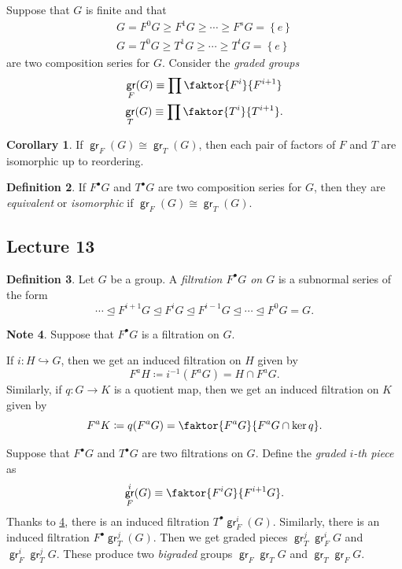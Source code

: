 \documentclass[10pt,letterpaper,cm]{nupset}
\theoremstyle{definition}
\newtheorem{definition}{Definition}[subsection]
\newtheorem{note}[definition]{Note}
\theoremstyle{theorem}
\newtheorem{corollary}[definition]{Corollary}
\theoremstyle{remark}
\newcommand{\1}{\mathbf{1}}
\newcommand{\0}{\vec 0}
\DeclareMathOperator{\gr}{\mathsf{gr}}
\begin{document}
\smallskip

Suppose that $G$ is finite and that 
\begin{gather*}
G = F^0G \geq F^1G \geq \cdots \geq F^sG = \left\{e\right\}  
\\ G = T^0G \geq T^1G \geq \cdots \geq T^tG = \left\{e\right\}
\end{gather*}
are two composition series for $G$. Consider the \textit{graded groups} 
\begin{gather*}
\gr_F(G) \equiv \prod \faktor{F^i}{F^{i+1}}
\\ \gr_T(G) \equiv \prod \faktor{T^i}{T^{i+1}}.
\end{gather*}

\begin{corollary}
 If $\gr_F(G) \cong \gr_T(G)$, then each pair of factors of $F$ and $T$ are isomorphic up to reordering. 
\end{corollary}

\begin{definition}
If $F^{\bullet}G$ and $T^{\bullet}G$ are two composition series for $G$, then they are \textit{equivalent} or \textit{isomorphic} if $\gr_F(G) \cong \gr_T(G)$.
\end{definition}

\subsection{Lecture 13}

\begin{definition}
Let $G$ be a group. A \textit{filtration $F^{\bullet}{G}$ on $G$} is a subnormal series of the form
\[
\cdots \unlhd F^{i+1}{G} \unlhd F^i{G} \unlhd F^{i-1}{G} \unlhd \cdots \unlhd F^0{G} = G
.\]
\end{definition}

\begin{note}\label{filt} Suppose that $F^{\bullet}G$ is a filtration on $G$.
\item If $i : H \hookrightarrow G$, then we get an induced filtration on $H$ given by $$F^a{H}\coloneqq  i^{-1}(F^aG) = H \cap F^a{G}.$$  Similarly, if $q: G \to K$ is a quotient map, then we get an induced filtration on $K$ given by $$F^aK\coloneqq  q(F^aG) = \faktor{F^aG}{F^aG \cap \ker{q}}.$$
\end{note}


Suppose that $F^{\bullet}G$ and $T^{\bullet}G$ are two filtrations on $G$. Define the \textit{graded $i$-th piece} as $$\gr_F^i(G) \equiv \faktor{F^iG}{F^{i+1}G}.$$ Thanks to \cref{filt}, there is an induced filtration $T^{\bullet}\gr_F^i(G)$. Similarly, there is an induced filtration $F^{\bullet}\gr_T^j(G)$. Then we get graded pieces $\gr_T^j\gr_F^iG$ and $\gr_F^i \gr_T^j G$. These produce two \textit{bigraded} groups $\gr_F\gr_TG$ and $\gr_T\gr_FG$.
\end{document}
